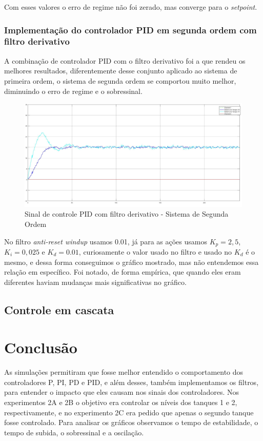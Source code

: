 \documentclass[
	12pt,				%
	openany,			%
	oneside,			%
	a4paper,			%
	english,			%
	french,				%
	spanish,			%
	brazil,				%
	]{abntex2}
\begin{document}
{Com esses valores o erro de regime não foi zerado, mas converge para o \textit{setpoint}.

\subsection{Implementação do controlador PID em segunda ordem com filtro derivativo}

A combinação de controlador PID com o filtro derivativo foi a que rendeu os melhores resultados, diferentemente desse conjunto aplicado ao sistema de primeira ordem, o sistema de segunda ordem se comportou muito melhor, diminuindo o erro de regime e o sobressinal.

\begin{figure}[h]
	\centering
	\includegraphics[scale=0.25]{12 - pid_segunda_ordem_filtro.jpg}
	\caption{Sinal de controle PID com filtro derivativo - Sistema de Segunda Ordem}
\end{figure}

No filtro \textit{anti-reset windup} usamos 0.01, já para as ações usamos $K_p=2,5$, $K_i=0,025$ e $K_d = 0.01$, curiosamente o valor usado no filtro e usado no $K_d$ é o mesmo, e dessa forma conseguimos o gráfico mostrado, mas não entendemos essa relação em específico. Foi notado, de forma empírica, que quando eles eram diferentes haviam mudanças mais significativas no gráfico. 

\section{Controle em cascata}
\chapter{Conclusão}

As simulações permitiram que fosse melhor entendido o comportamento dos controladores P, PI, PD e PID, e além desses, também implementamos os filtros, para entender o impacto que eles causam nos sinais dos controladores. Nos experimentos 2A e 2B o objetivo era controlar os níveis dos tanques 1 e 2, respectivamente, e no experimento 2C era pedido que apenas o segundo tanque fosse controlado. Para analisar os gráficos observamos o tempo de estabilidade, o tempo de subida, o sobressinal e a oscilação.

}
\end{document}
